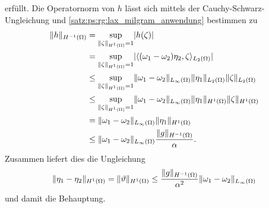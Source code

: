 \begin{Lemma}
\begin{Beweis}
        erfüllt.
        Die Operatornorm von $h$ lässt sich mittels der Cauchy-Schwarz-Ungleichung und \cref{satz:ps:rg:lax_milgram_anwendung} bestimmen zu
        \begin{equation}
            \begin{aligned}
                \lVert h\rVert_{H^{-1}(\Omega)}
                  &=    \sup_{\lVert\zeta\rVert_{H^{1}(\Omega)} = 1} \lvert h(\zeta)\rvert
                \\&=    \sup_{\lVert\zeta\rVert_{H^{1}(\Omega)} = 1} \lvert\langle(\omega_{1} - \omega_{2}) \eta_{2},\zeta\rangle_{L_{2}(\Omega)}\rvert
                \\&\leq \sup_{\lVert\zeta\rVert_{H^{1}(\Omega)} = 1} \lVert\omega_{1} - \omega_{2}\rVert_{L_{\infty}(\Omega)} \lVert\eta_{1}\rVert_{L_{2}(\Omega)} \lVert\zeta\rVert_{L_{2}(\Omega)}
                \\&\leq \sup_{\lVert\zeta\rVert_{H^{1}(\Omega)} = 1} \lVert\omega_{1} - \omega_{2}\rVert_{L_{\infty}(\Omega)} \lVert\eta_{1}\rVert_{H^{1}(\Omega)} \lVert\zeta\rVert_{H^{1}(\Omega)}
                \\&=    \lVert\omega_{1} - \omega_{2}\rVert_{L_{\infty}(\Omega)} \lVert\eta_{1}\rVert_{H^{1}(\Omega)}
                \\&\leq \lVert\omega_{1} - \omega_{2}\rVert_{L_{\infty}(\Omega)} \frac{\lVert g\rVert_{H^{-1}(\Omega)}}{\alpha}.
            \end{aligned}
        \end{equation}
        Zusammen liefert dies die Ungleichung
        \begin{equation}
            \lVert\eta_{1} - \eta_{2}\rVert_{H^{1}(\Omega)}
            = \lVert\vartheta\rVert_{H^{1}(\Omega)} \leq \frac{\lVert g\rVert_{H^{-1}(\Omega)}}{\alpha^{2}} \lVert\omega_{1} - \omega_{2}\rVert_{L_{\infty}(\Omega)}
        \end{equation}
        und damit die Behauptung.
    \end{Beweis}
\end{Lemma}

